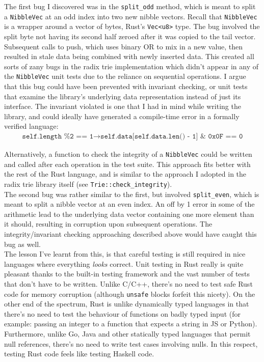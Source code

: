 \documentclass[a4paper,12pt]{article}
\newcommand{\code}{\texttt}
\begin{document}
The first bug I discovered was in the \code{split\_odd} method, which is meant to split a \code{NibbleVec} at an odd index into two new nibble vectors. Recall that \code{NibbleVec} is a wrapper around a vector of bytes, Rust's \code{Vec<u8>} type. The bug involved the split byte not having its second half zeroed after it was copied to the tail vector. Subsequent calls to push, which uses binary OR to mix in a new value, then resulted in stale data being combined with newly inserted data. This created all sorts of zany bugs in the radix trie implementation which didn't appear in any of the \code{NibbleVec} unit tests due to the reliance on sequential operations. I argue that this bug could have been prevented with invariant checking, or unit tests that examine the library's underlying data representation instead of just its interface. The invariant violated is one that I had in mind while writing the library, and could ideally have generated a compile-time error in a formally verified language:
\begin{eqnarray*}
\code{self.length \% 2 == 1} \rightarrow \code{self.data[self.data.len() - 1] & 0x0F == 0}
\end{eqnarray*}

Alternatively, a function to check the integrity of a \code{NibbleVec} could be written and called after each operation in the test suite. This approach fits better with the rest of the Rust language, and is similar to the approach I adopted in the radix trie library itself (see \code{Trie::check\_integrity}).\\

The second bug was rather similar to the first, but involved \code{split\_even}, which is meant to split a nibble vector at an even index. An off by 1 error in some of the arithmetic lead to the underlying data vector containing one more element than it should, resulting in corruption upon subsequent operations. The integrity/invariant checking approaching described above would have caught this bug as well.\\

The lesson I've learnt from this, is that careful testing is still required in nice languages where everything \textit{looks} correct. Unit testing in Rust really is quite pleasant thanks to the built-in testing framework and the vast number of tests that don't have to be written. Unlike C/C++, there's no need to test safe Rust code for memory corruption (although \code{unsafe} blocks forfeit this nicety). On the other end of the spectrum, Rust is unlike dynamically typed languages in that there's no need to test the behaviour of functions on badly typed input (for example: passing an integer to a function that expects a string in JS or Python). Furthermore, unlike Go, Java and other statically typed languages that permit null references, there's no need to write test cases involving nulls. In this respect, testing Rust code feels like testing Haskell code.
\end{document}
